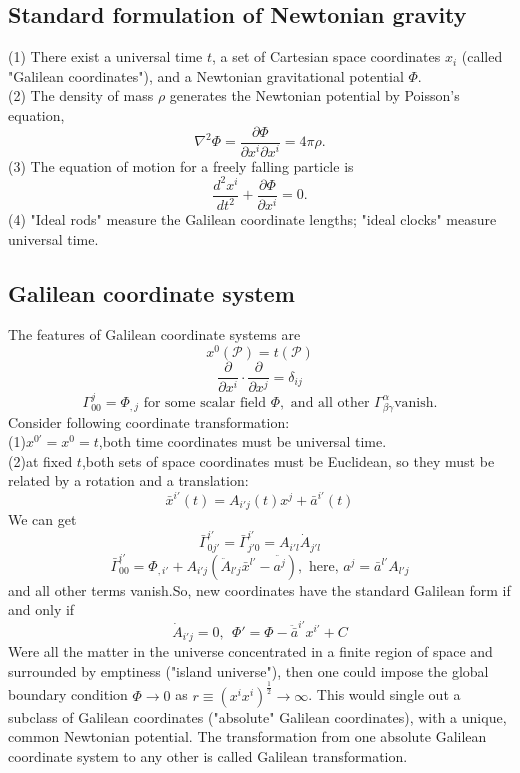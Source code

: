 \documentclass{article}
\begin{document}
\subsection{Standard formulation of Newtonian gravity}
(1) There exist a universal time $t$, a set of Cartesian space coordinates $x_i$ (called "Galilean coordinates"), and a Newtonian gravitational potential $\Phi$.\\
(2) The density of mass $\rho$ generates the Newtonian potential by Poisson's equation,
\[\nabla^2\Phi = \frac{\partial \Phi}{\partial x^i \partial x^i} = 4\pi\rho.\]
(3) The equation of motion for a freely falling particle is
\[\frac{d^2 x^i}{dt^2} + \frac{\partial \Phi}{\partial x^i} =0 .\]
(4) "Ideal rods" measure the Galilean coordinate lengths; "ideal clocks" measure universal time.

\subsection{Galilean coordinate system}
The features of Galilean coordinate systems are
\[x^0(\mathcal{P}) = t(\mathcal{P})\]
\[\frac{\partial}{\partial x^i} \cdot \frac{\partial}{\partial x^j} = \delta_{ij}\]
\[\Gamma^j_{00} = \Phi_{,j} \mbox{ for some scalar field }\Phi,\mbox{ and all other } \Gamma^{\alpha}_{\beta \gamma} \mbox{vanish.}\]
Consider following coordinate transformation:\\
(1)$x^{0'}=x^0=t$,both time coordinates must be universal time.\\
(2)at fixed $t$,both sets of space coordinates must be Euclidean, so they must be related by a rotation and a translation:
\[\bar{x}^{i'}(t) = A_{i'j}(t)x^j + \bar{a}^{i'}(t)\]
We can get
\[\bar{\Gamma}^{i'}_{0j'} = \bar{\Gamma}^{i'}_{j'0} = A_{i'l}\dot{A}_{j'l}\]
\[\bar{\Gamma}^{i'}_{00} = \Phi_{,i'} + A_{i'j}(\ddot{A}_{l'j}\bar{x}^{l'}-\ddot{a^{j}}), \mbox{   here, }a^{j} = \bar{a}^{l'}A_{l'j}\]
and all other terms vanish.So, new coordinates have the standard Galilean form  if and only if
\[\dot{A}_{i'j}=0,\ \ \Phi'=\Phi-\ddot{\bar{a}}^{i'}x^{i'}+C\]
Were all the matter in the universe concentrated in a finite region of space and surrounded by emptiness ("island universe"), then one could impose the global boundary condition $\Phi \to 0$ as $r \equiv (x^ix^i)^{\frac{1}{2}} \to \infty$. This would single out a subclass of Galilean coordinates ("absolute" Galilean coordinates), with a unique, common Newtonian potential. The transformation from one
absolute Galilean coordinate system to any other is called Galilean transformation.
\end{document}

